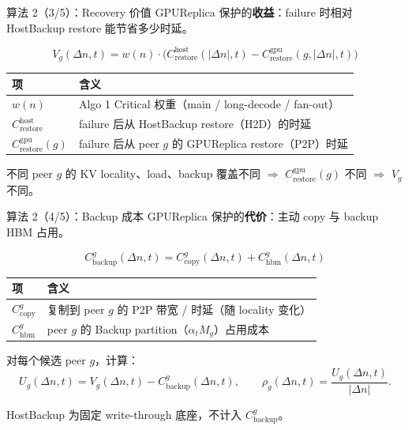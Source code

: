 \documentclass[aspectratio=43]{beamer}
\begin{document}
\begin{frame}{算法 2（3/5）：Recovery 价值}
  \small
  GPUReplica 保护的\textbf{收益}：failure 时相对 HostBackup restore 能节省多少时延。

  \vspace{0.08cm}
  \[
    V_g(\Delta n,t)
    =
    w(n)
    \cdot
    \bigl(
      C_{\mathrm{restore}}^{\mathrm{host}}(|\Delta n|, t)
      -
      C_{\mathrm{restore}}^{\mathrm{gpu}}(g, |\Delta n|, t)
    \bigr)
  \]

  \vspace{0.06cm}
  \scriptsize
  \renewcommand{\arraystretch}{1.12}
  \begin{tabular}{p{}p{}}
    \toprule
    项 & 含义 \\
    \midrule
    $w(n)$ & Algo 1 Critical 权重（main / long-decode / fan-out） \\
    $C_{\mathrm{restore}}^{\mathrm{host}}$ & failure 后从 HostBackup restore（H2D）的时延 \\
    $C_{\mathrm{restore}}^{\mathrm{gpu}}(g)$ & failure 后从 peer $g$ 的 GPUReplica restore（P2P）时延 \\
    \bottomrule
  \end{tabular}

  \vspace{0.08cm}
  \footnotesize
  不同 peer $g$ 的 KV locality、load、backup 覆盖不同 $\Rightarrow$ $C_{\mathrm{restore}}^{\mathrm{gpu}}(g)$ 不同 $\Rightarrow$ $V_g$ 不同。
\end{frame}

\begin{frame}{算法 2（4/5）：Backup 成本}
  \small
  GPUReplica 保护的\textbf{代价}：主动 copy 与 backup HBM 占用。

  \vspace{0.08cm}
  \[
    C_{\mathrm{backup}}^g(\Delta n,t)
    =
    C_{\mathrm{copy}}^g(\Delta n,t)
    +
    C_{\mathrm{hbm}}^g(\Delta n,t)
  \]

  \vspace{0.06cm}
  \scriptsize
  \renewcommand{\arraystretch}{1.12}
  \begin{tabular}{p{}p{}}
    \toprule
    项 & 含义 \\
    \midrule
    $C_{\mathrm{copy}}^g$ & 复制到 peer $g$ 的 P2P 带宽 / 时延（随 locality 变化） \\
    $C_{\mathrm{hbm}}^g$ & peer $g$ 的 Backup partition（$\alpha_t M_g$）占用成本 \\
    \bottomrule
  \end{tabular}

  \vspace{0.10cm}
  对每个候选 peer $g$，计算：
  \[
    U_g(\Delta n,t) = V_g(\Delta n,t) - C_{\mathrm{backup}}^g(\Delta n,t),
    \qquad
    \rho_g(\Delta n,t) = \frac{U_g(\Delta n,t)}{|\Delta n|}.
  \]

  \vspace{0.04cm}
  \footnotesize
  HostBackup 为固定 write-through 底座，不计入 $C_{\mathrm{backup}}^g$。
\end{frame}
\end{document}
